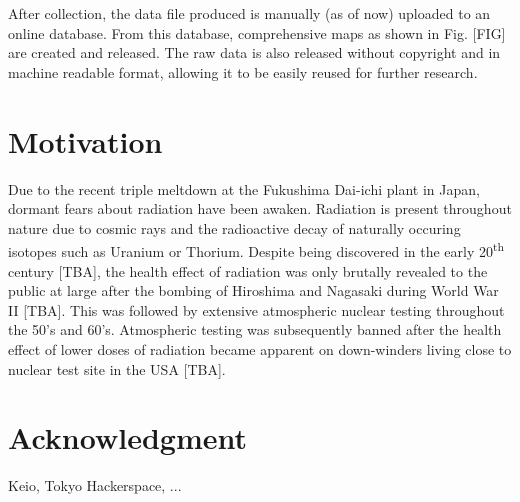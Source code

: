 \documentclass[11pt]{article}
\begin{document}
After collection, the data file produced is manually (as of now) uploaded to an online database. From this database, comprehensive maps as shown in Fig. [FIG] 
are created and released. The raw data is also released without copyright and in machine readable format, allowing it to be easily reused for further research.


\section*{Motivation}
\label{sec:motivation}

Due to the recent triple meltdown at the Fukushima Dai-ichi plant in Japan, dormant fears about radiation have been awaken.
Radiation is present throughout nature due to cosmic rays and the radioactive decay of naturally occuring isotopes such as Uranium or Thorium.
Despite being discovered in the early 20\textsuperscript{th} century [TBA], the health effect of radiation was only brutally revealed to the public at
large after the bombing of Hiroshima and Nagasaki during World War II [TBA]. This was followed by extensive atmospheric nuclear testing throughout the 50's and 60's.
Atmospheric testing was subsequently banned after the health effect of lower doses of radiation became apparent on down-winders living close to
nuclear test site in the USA [TBA].



\section*{Acknowledgment}
Keio, Tokyo Hackerspace, ...
\end{document}
